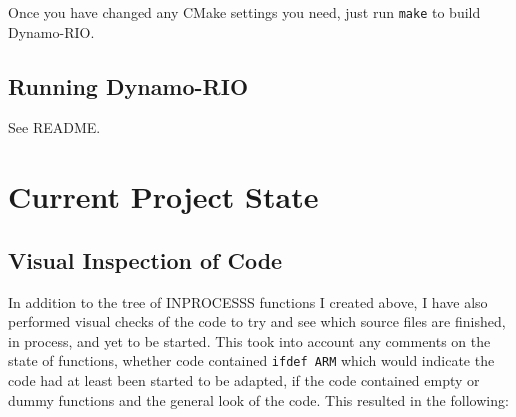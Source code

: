 \documentclass[a4paper]{article}
\begin{document}
Once you have changed any CMake settings you need, just run \texttt{make} to
build Dynamo-RIO.

\subsection{Running Dynamo-RIO}
See README.


\section{Current Project State}
\subsection{Visual Inspection of Code}
In addition to the tree of INPROCESSS functions I created above, I have also
performed visual checks of the code to try and see which source files are
finished, in process, and yet to be started. This took into account any comments
on the state of functions, whether code contained \texttt{ifdef ARM} which would
indicate the code had at least been started to be adapted, if the code contained
empty or dummy functions and the general look of the code. This resulted in the
following:
\end{document}
